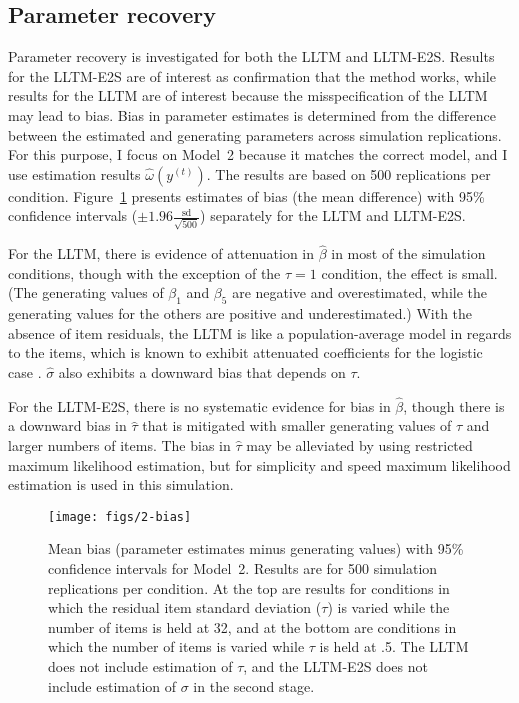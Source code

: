 \subsection{Parameter recovery}

Parameter recovery is investigated for both the LLTM and LLTM-E2S. Results for the LLTM-E2S are of interest as confirmation that the method works, while results for the LLTM are of interest because the misspecification of the LLTM may lead to bias. 
Bias in parameter estimates is determined from the difference between the estimated and generating parameters across simulation replications. 
For this purpose, I focus on Model~2 because it matches the correct model, and I use estimation results $\hat \omega(y^{(t)})$. 
The results are based on 500 replications per condition. 
Figure~\ref{fig:2-bias} presents estimates of bias (the mean difference) with 95\% confidence intervals ($\pm 1.96 \frac{\mathrm{sd}}{\sqrt{500}}$) separately for the LLTM and LLTM-E2S. 

For the LLTM, there is evidence of attenuation in $\hat \beta$ in most of the simulation conditions, though with the exception of the $\tau=1$ condition, the effect is small.
(The generating values of $\beta_1$ and $\beta_5$ are negative and overestimated, while the generating values for the others are positive and underestimated.)
With the absence of item residuals, the LLTM is like a population-average model in regards to the items, which is known to exhibit attenuated coefficients for the logistic case \parencite{ritz2004equivalence}.
$\hat \sigma$ also exhibits a downward bias that depends on $\tau$.

For the LLTM-E2S, there is no systematic evidence for bias in $\hat \beta$, though there is a downward bias in $\hat \tau$ that is mitigated with smaller generating values of $\tau$ and larger numbers of items. The bias in $\hat \tau$ may be alleviated by using restricted maximum likelihood estimation, but for simplicity and speed maximum likelihood estimation is used in this simulation.

\begin{figure}
	\centering
	\texttt{[image: figs/2-bias]}
	\caption{Mean bias (parameter estimates minus generating values) with 95\% confidence intervals for Model~2. Results are for 500 simulation replications per condition. At the top are results for conditions in which the residual item standard deviation ($\tau$) is varied while the number of items is held at 32, and at the bottom are conditions in which the number of items is varied while $\tau$ is held at .5. The LLTM does not include estimation of $\tau$, and the LLTM-E2S does not include estimation of $\sigma$ in the second stage.}
	\label{fig:2-bias}
\end{figure}


